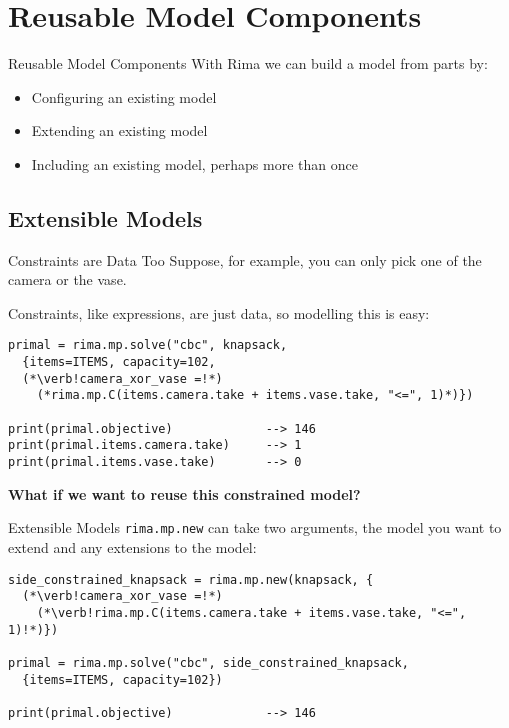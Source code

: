 \documentclass[smaller,handout]{beamer}
\begin{document}

\section{Reusable Model Components}


\begin{frame}{Reusable Model Components}
  With Rima we can build a model from parts by:
  \begin{itemize}
    \item Configuring an existing model
    \item Extending an existing model
    \item Including an existing model, perhaps more than once
 \end{itemize}
\end{frame}


\subsection{Extensible Models}
\begin{frame}[fragile]{Constraints are Data Too}
  Suppose, for example, you can only pick one of the camera or the vase.\\

  Constraints, like expressions, are just data, so modelling this is easy:
  \begin{lstlisting}
primal = rima.mp.solve("cbc", knapsack,
  {items=ITEMS, capacity=102,
  (*\verb!camera_xor_vase =!*)
    (*rima.mp.C(items.camera.take + items.vase.take, "<=", 1)*)})
  
print(primal.objective)             --> 146
print(primal.items.camera.take)     --> 1
print(primal.items.vase.take)       --> 0
  \end{lstlisting}
  \bf{What if we want to reuse this constrained model?}
\end{frame}


\begin{frame}[fragile]{Extensible Models}
  \lstinline!rima.mp.new! can take two arguments,
  the model you want to extend
  and any extensions to the model:
  \begin{lstlisting}
side_constrained_knapsack = rima.mp.new(knapsack, {
  (*\verb!camera_xor_vase =!*)
    (*\verb!rima.mp.C(items.camera.take + items.vase.take, "<=", 1)!*)})

primal = rima.mp.solve("cbc", side_constrained_knapsack,
  {items=ITEMS, capacity=102})

print(primal.objective)             --> 146
  \end{lstlisting}
\end{frame}
\end{document}
